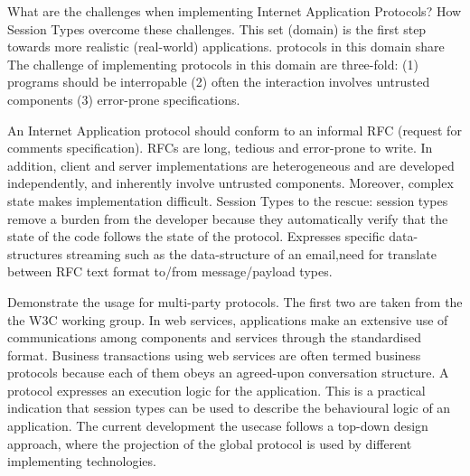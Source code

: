 What are the challenges when implementing Internet Application Protocols?
How Session Types overcome these challenges.  
This set (domain) is the first step towards more realistic (real-world) applications. 
protocols in this domain share 
The challenge of implementing protocols in this domain are three-fold: (1) programs should be interropable (2) often the interaction involves untrusted components (3) error-prone specifications. 
 
An Internet Application protocol should conform to an informal RFC (request for comments specification). 
RFCs are long, tedious and error-prone to write. In addition, client and server implementations are heterogeneous  and are developed independently, and inherently involve untrusted components. Moreover, complex state makes implementation difficult. 
Session Types to the rescue: session types remove a burden from the developer because they automatically verify that the state of the code follows the state of the protocol. Expresses specific data-structures streaming such as the data-structure of an email,need for translate between RFC text format to/from message/payload types. 

 
Demonstrate the usage for multi-party protocols. The first two are taken from the the W3C working group.  
In web services, applications make
an extensive use of communications among components and services through the
standardised format. Business transactions using web services
are often termed business protocols because each of them obeys an agreed-upon conversation structure. 
A protocol expresses an execution logic for the application. This is a practical indication
that session types can be used to describe the behavioural logic of an application. The current development the usecase follows a top-down design approach, where the projection of the global protocol is used by different
implementing technologies.

